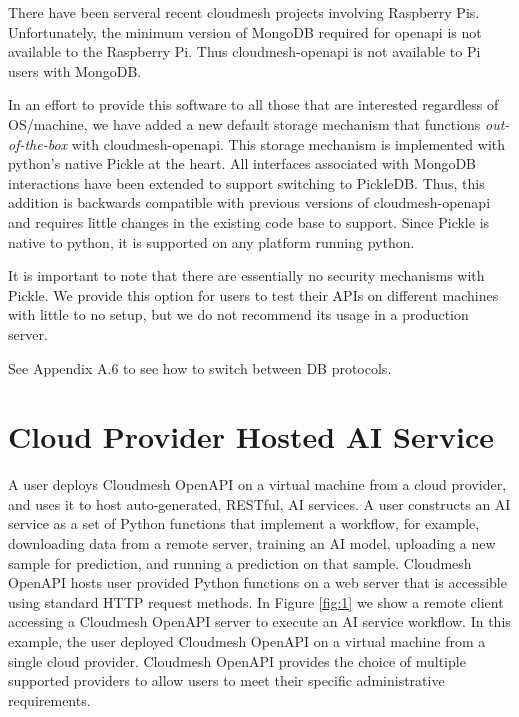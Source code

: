 There have been serveral recent cloudmesh projects involving Raspberry
Pis. Unfortunately, the minimum version of MongoDB required for openapi
is not available to the Raspberry Pi. Thus cloudmesh-openapi is not
available to Pi users with MongoDB.

In an effort to provide this software to all those that are interested
regardless of OS/machine, we have added a new default storage mechanism
that functions {\em out-of-the-box} with cloudmesh-openapi. This storage
mechanism is implemented with python's native Pickle at the heart. All
interfaces associated with MongoDB interactions have been extended to
support switching to PickleDB. Thus, this addition is backwards
compatible with previous versions of cloudmesh-openapi and requires
little changes in the existing code base to support. Since Pickle is
native to python, it is supported on any platform running python.

It is important to note that there are essentially no security
mechanisms with Pickle. We provide this option for users to test their
APIs on different machines with little to no setup, but we do not
recommend its usage in a production server.

See Appendix A.6 to see how to switch between DB protocols.

\section{Cloud Provider Hosted AI
Service}\label{cloud-provider-hosted-ai-service}

A user deploys Cloudmesh OpenAPI on a virtual machine from a cloud
provider, and uses it to host auto-generated, RESTful, AI services. A
user constructs an AI service as a set of Python functions that
implement a workflow, for example, downloading data from a remote
server, training an AI model, uploading a new sample for prediction, and
running a prediction on that sample. Cloudmesh OpenAPI hosts user
provided Python functions on a web server that is accessible using
standard HTTP request methods. In Figure \ref{fig:1} we show a remote client
accessing a Cloudmesh OpenAPI server to execute an AI service workflow.
In this example, the user deployed Cloudmesh OpenAPI on a virtual
machine from a single cloud provider. Cloudmesh OpenAPI provides the
choice of multiple supported providers to allow users to meet their
specific administrative requirements.


